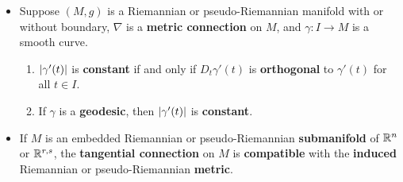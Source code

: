 \documentclass[11pt]{article}
\begin{document}
\begin{itemize}
\item \begin{corollary}
Suppose $(M, g)$ is a Riemannian or pseudo-Riemannian manifold with or without boundary, $\nabla$ is a \textbf{metric connection} on $M$, and $\gamma: I \rightarrow M$ is a smooth curve.
\begin{enumerate}
\item $\left\lvert \gamma'(t) \right\rvert$ is \textbf{constant} if and only if $D_t\gamma'(t)$ is \textbf{orthogonal} to $\gamma'(t)$ for all $t \in I$.
\item If $\gamma$ is a \textbf{geodesic}, then $\left\lvert \gamma'(t) \right\rvert$ is \textbf{constant}.
\end{enumerate}
\end{corollary}

\item \begin{proposition}
If $M$ is an embedded Riemannian or pseudo-Riemannian \textbf{submanifold} of ${\mathbb R}^n$ or ${\mathbb R}^{r,s}$, the \textbf{tangential connection} on $M$ is \textbf{compatible} with the \textbf{induced} Riemannian or pseudo-Riemannian \textbf{metric}.
\end{proposition}
\end{itemize}
\end{document}
